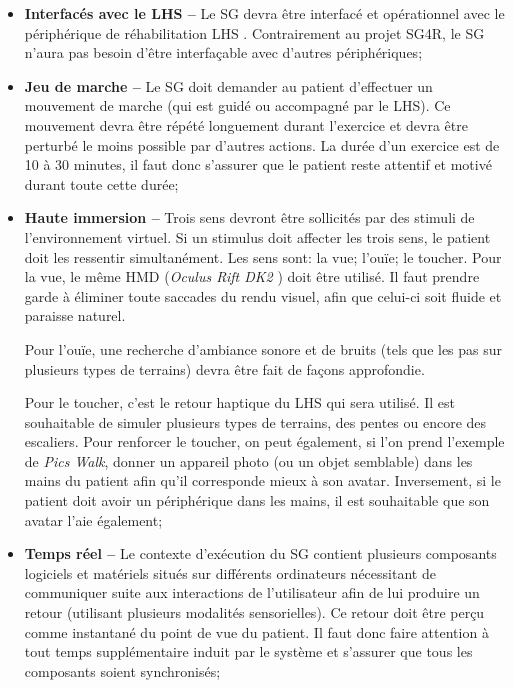 	\begin{itemize}	
		\item \textbf{Interfacés avec le LHS --} Le SG devra être interfacé et opérationnel avec le périphérique de réhabilitation LHS \cite{LHS_website}. Contrairement au projet SG4R, le SG n'aura pas besoin d'être interfaçable avec d'autres périphériques;
		
		\item \textbf{Jeu de marche --} Le SG doit demander au patient d'effectuer un mouvement de marche (qui est guidé ou accompagné par le LHS). Ce mouvement devra être répété longuement durant l'exercice et devra être perturbé le moins possible par d'autres actions. La durée d'un exercice est de 10 à 30 minutes, il faut donc s'assurer que le patient reste attentif et motivé durant toute cette durée;
		
		\item \textbf{Haute immersion --} Trois sens devront être sollicités par des stimuli de l'environnement virtuel. Si un stimulus doit affecter les trois sens, le patient doit les ressentir simultanément. Les sens sont: la vue; l'ouïe; le toucher. Pour la vue, le même HMD (\textit{Oculus Rift DK2} \cite{OculusDk2_website}) doit être utilisé. Il faut prendre garde à éliminer toute saccades du rendu visuel, afin que celui-ci soit fluide et paraisse naturel.
		
		Pour l'ouïe, une recherche d'ambiance sonore et de bruits (tels que les pas sur plusieurs types de terrains) devra être fait de façons approfondie.
		
		Pour le toucher, c'est le retour haptique du LHS qui sera utilisé. Il est souhaitable de simuler plusieurs types de terrains, des pentes ou encore des escaliers. Pour renforcer le toucher, on peut également, si l'on prend l'exemple de \textit{Pics Walk}, donner un appareil photo (ou un objet semblable) dans les mains du patient afin qu'il corresponde mieux à son avatar. Inversement, si le patient doit avoir un périphérique dans les mains, il est souhaitable que son avatar l'aie également;
		
		\item \textbf{Temps réel --} Le contexte d'exécution du SG contient plusieurs composants logiciels et matériels situés sur différents ordinateurs nécessitant de communiquer suite aux interactions de l'utilisateur afin de lui produire un retour (utilisant plusieurs modalités sensorielles). Ce retour doit être perçu comme instantané du point de vue du patient. Il faut donc faire attention à tout temps supplémentaire induit par le système et s'assurer que tous les composants soient synchronisés;
		

\end{itemize}
